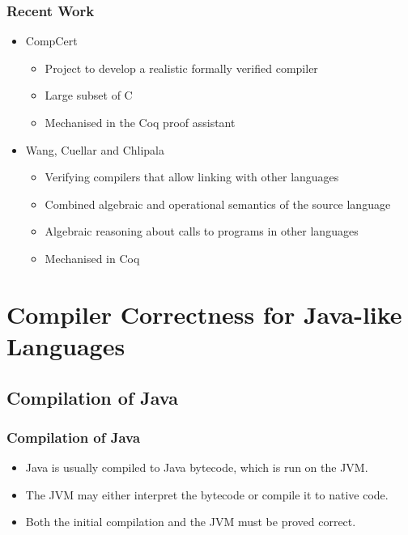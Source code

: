 \documentclass[usenames,dvipsnames,svgnames,table]{beamer}
\newcommand{\footmake}[1]{
\ifthenelse{\equal{#1}{}}%
	{}%
	{\footnotetext{#1}}%
}
\newenvironment{slide}[2][fragile,environment=slide]
{\begin{frame}[#1]
	\frametitle{#2}\begin{refsegment}}
{\footmake{\printbibliography[segment=\therefsegment]}\end{refsegment}\end{frame}}
\begin{document}
\begin{slide}{Recent Work}
  \begin{itemize}
  \item CompCert\cite{leroy2012}
    \begin{itemize}
    \item Project to develop a realistic formally verified compiler
    \item Large subset of C
    \item Mechanised in the Coq proof assistant\cite{coq2004}
    \end{itemize}
  \item Wang, Cuellar and Chlipala\cite{wang2014}
    \begin{itemize}
    \item Verifying compilers that allow linking with other languages
    \item Combined algebraic and operational semantics of the source language
    \item Algebraic reasoning about calls to programs in other languages
    \item Mechanised in Coq 
    \end{itemize}
  \end{itemize}
\end{slide}

\section{Compiler Correctness for Java-like Languages}

\frame{\sectionpage}

\subsection{Compilation of Java}

\begin{frame}
  \frametitle{Compilation of Java}
  \begin{itemize}
  \item Java is usually compiled to Java bytecode, which is run on the JVM.
  \item The JVM may either interpret the bytecode or compile it to native code.
  \item Both the initial compilation and the JVM must be proved correct.
  \end{itemize}
  \begin{center}
  \end{center}
\end{frame}
\end{document}
